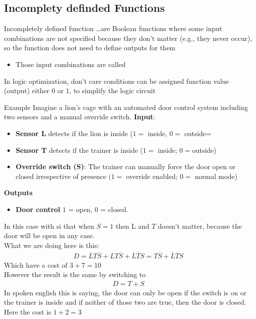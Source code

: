 \subsection{Incomplety definded Functions}
\begin{parag}{Incompletely defined function}
    …are Boolean functions where some input combinations are not specified because they don’t matter (e.g., they never occur), so the function does not need to define outputs for them
    \begin{itemize}
        \item Those input combinations are called 
    \end{itemize}
    In logic optimization, don't care conditions can be assigned function value (output) either $0$ or $1$, to simplify the logic circuit
\end{parag}
\begin{parag}{Example}
    Imagine a lion's cage with an automated door control system including two sensors and a manual override switch.
    \textbf{Input}:
    \begin{itemize}
        \item \textbf{Sensor L} detects if the lion is inside ($1 =$ inside, $0 = $ outside=
        \item \textbf{Sensor T} detects if the trainer is inside ($1 = $ inside; $0 = $outside)
        \item \textbf{Override switch (S)}: The trainer can manually force the door open or closed irrespective of presence $(1 = $ override enabled; $0 = $ normal mode)
    \end{itemize}
    \textbf{Outputs}
    \begin{itemize}
        \item \textbf{Door control} $1$ = open, 0 = closed.
    \end{itemize}
    In this case with si that when $S = 1$ then L and $T$ doesn't matter, because the door will be open in any case.\\
    What we are doing here is this:
    \begin{align*}
        D = \overline{L}T \overline{S} + LT \overline{S} + \overline{L} \overline{T}S  = T \overline{S} + \overline{L} \overline{T}S
    \end{align*}
    Which have a cost of $ 3 + 7 = 10$\\
    However the result is the same by switching to
    \begin{align*}
        D = T + S
    \end{align*}
    In spoken english this is saying, the door can only be open if the switch is on or the trainer is inside and if neither of those two are true, then the door is closed. Here the cost is $1 + 2 = 3$
\end{parag}

